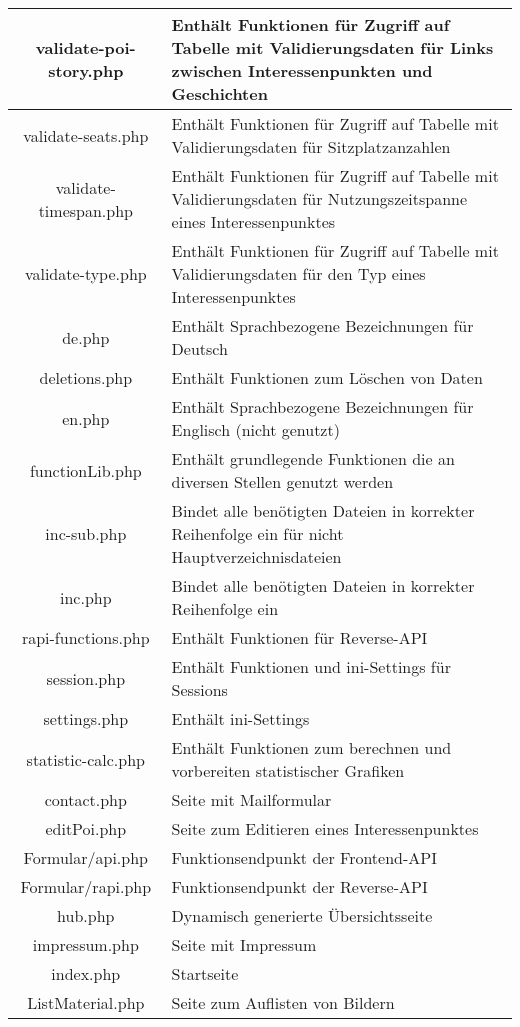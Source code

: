 \begin{longtable}[H]{|c|p{10cm}|}
	validate-poi-story.php & Enthält Funktionen für Zugriff auf Tabelle mit Validierungsdaten für Links zwischen Interessenpunkten und Geschichten \\ \hline
	validate-seats.php & Enthält Funktionen für Zugriff auf Tabelle mit Validierungsdaten für Sitzplatzanzahlen \\ \hline
	validate-timespan.php & Enthält Funktionen für Zugriff auf Tabelle mit Validierungsdaten für Nutzungszeitspanne eines Interessenpunktes \\ \hline
	validate-type.php & Enthält Funktionen für Zugriff auf Tabelle mit Validierungsdaten für den Typ eines Interessenpunktes \\ \hline
	de.php & Enthält Sprachbezogene Bezeichnungen für Deutsch \\ \hline
	deletions.php & Enthält Funktionen zum Löschen von Daten \\ \hline
	en.php & Enthält Sprachbezogene Bezeichnungen für Englisch (nicht genutzt) \\ \hline
	functionLib.php & Enthält grundlegende Funktionen die an diversen Stellen genutzt werden \\ \hline
	inc-sub.php & Bindet alle benötigten Dateien in korrekter Reihenfolge ein für nicht Hauptverzeichnisdateien \\ \hline
	inc.php & Bindet alle benötigten Dateien in korrekter Reihenfolge ein \\ \hline
	rapi-functions.php & Enthält Funktionen für Reverse-API \\ \hline
	session.php & Enthält Funktionen und ini-Settings für Sessions \\ \hline
	settings.php & Enthält ini-Settings \\ \hline
	statistic-calc.php & Enthält Funktionen zum berechnen und vorbereiten statistischer Grafiken \\ \hline
	contact.php & Seite mit Mailformular \\ \hline
	editPoi.php & Seite zum Editieren eines Interessenpunktes \\ \hline
	Formular/api.php & Funktionsendpunkt der Frontend-API \\ \hline
	Formular/rapi.php & Funktionsendpunkt der Reverse-API \\ \hline
	hub.php & Dynamisch generierte Übersichtsseite \\ \hline
	impressum.php & Seite mit Impressum \\ \hline
	index.php & Startseite \\ \hline
	ListMaterial.php & Seite zum Auflisten von Bildern \\ \hline

\end{longtable}
